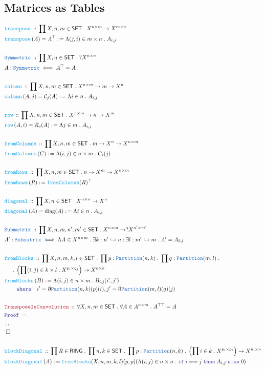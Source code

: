 \documentclass[12pt]{scrartcl}
\newcommand{\TYPE}[1]{\textcolor{NavyBlue}{\mathtt{#1}}}
\newcommand{\FUNC}[1]{\textcolor{Cerulean}{\mathtt{#1}}}
\newcommand{\LOGIC}[1]{\textcolor{Blue}{\mathtt{#1}}}
\newcommand{\THM}[1]{\textcolor{Maroon}{\mathtt{#1}}}
\renewcommand{\.}{\; . \;}
\newcommand{\de}{: \kern 0.1pc =}
\newcommand{\where}{\LOGIC{where}}
\newcommand{\If}{\LOGIC{if} \;}
\newcommand{\Then}{ \; \LOGIC{then} \;}
\newcommand{\Else}{\; \LOGIC{else} \;}
\newcommand{\Act}[1]{\left(#1\right)}
\newcommand{\Theorem}[2]{& \THM{#1} \, :: \, #2 \\ & \Proof = \\ }
\newcommand{\DeclareType}[2]{& \TYPE{#1} \, :: \, #2 \\}
\newcommand{\DefineType}[3]{& #1 : \TYPE{#2} \iff #3 \\}
\newcommand{\DeclareFunc}[2]{& \FUNC{#1} \, :: \, #2 \\}
\newcommand{\DefineFunc}[3]{&  \FUNC{#1}\Act{#2} \de #3 \\}
\newcommand{\DefineNamedFunc}[4]{&  \FUNC{#1}\Act{#2} = #3 \de #4 \\}
\newcommand{\NewLine}{\\ & \kern 1pc}
\newcommand{\Page}[1]{ \begin{align*} #1 \end{align*}   }
\newcommand{ \bd }{ \ByDef }
\newcommand{\NoProof}{ & \ldots \\ \EndProof}
\newcommand{\ToInj}{\hookrightarrow}
\newcommand{\QED}{\; \square}
\newcommand{\EndProof}{& \QED \\}
\newcommand{\ByDef}{\eth}
\newcommand{\Proof}{\LOGIC{Proof} \; }
\newcommand{\C}{\mathcal{C}}
\newcommand{\R}{\mathcal{R}}
\newcommand{\SET}{\mathsf{SET}}
\DeclareMathOperator{\diag}{diag}
\newcommand{\RING}{\mathsf{RING}}
\begin{document}
\subsection{Matrices as Tables}
\Page{
	\DeclareFunc{transpose}{\prod X,n,m \in \SET \. X^{n \times m} \to X^{m \times n} }
	\DefineNamedFunc{transpose}{A}{A^\top}{\Lambda (j,i) \in m \times n \. A_{i,j}}
	\\
	\DeclareType{Symmetric}{\prod X,n \in \SET \. ?X^{n \times n}}
	\DefineType{A}{Symmetric}{A^\top = A}
	\\
	\DeclareFunc{column}{\prod X,n,m \in \SET \. X^{n \times m} \to m \to X^n}
	\DefineNamedFunc{column}{A,j}{\C_j(A)}{\Lambda i \in n \. A_{i,j}}
	\\
	\DeclareFunc{row}{\prod X,n,m \in \SET \. X^{n \times m} \to n \to X^m}
	\DefineNamedFunc{row}{A,i}{\R_i(A)}{\Lambda j \in m \. A_{i,j}}
	\\
	\DeclareFunc{fromColumns}{\prod X,n,m \in \SET \. m \to X^n \to X^{n \times m}}
	\DefineFunc{fromColumns}{C}{\Lambda (i,j) \in n \times m \. C_i(j)}
	\\
	\DeclareFunc{fromRows}{\prod X,n,m \in \SET \. n \to X^m \to X^{n \times m}}
	\DefineFunc{fromRows}{R}{\FUNC{fromColumns}(R)^\top}
	\\
	\DeclareFunc{diagonal}{\prod X,n \in \SET \. X^{n \times n} \to X^n}
	\DefineNamedFunc{diagonal}{A}{\diag(A)}{\Lambda i \in n \. A_{i,i} }
	\\
	\DeclareType{Submatrix}{\prod X,n,m,n',m' \in \SET \. X^{n\times m} \to ?X^{n'\times m'}}
	\DefineType{A'}{Submatrix}{\Lambda A \in X^{n\times m} \. 
		\exists k : n' \ToInj n : \exists l : m' \ToInj m \. A' = A_{k,l} }
	\\
	\DeclareFunc{fromBlocks}{
		\prod X,n,m,k,l \in \SET \. 
		\prod p : \TYPE{Partition}(n,k) \.
		\prod q : \TYPE{Partition}(m,l) \.
		\NewLine \.
		\left(\prod (i,j) \in k \times l \. X^{p_i \times q_j}\right) \to X^{n \times k}
	}
	\DefineFunc{fromBlocks}{B}{
		\Lambda (i,j) \in n \times m \. 
		B_{i,j}(i',j') \NewLine
		\quad \where \quad
		i' = \bd \TYPE{Partition}(n,k)(p)(i),
		j' = \bd \TYPE{Partition}(m,l)(q)(j)
	}
	\\
	\Theorem{TransposeIsConvolution}{\forall X,n,m \in \SET \. \forall A \in A^{n\times m} \. A^{\top\top} = A}
	\NoProof
	\\
	\DeclareFunc{blockDiagonal}{
		\prod R \in \RING \. \prod n,k \in \SET \. \prod p : \TYPE{Partition}(n,k) \. 
		\left( \prod i \in k \. 
		X^{p_i \times p_i} \right) \to X^{n,\times n}
	}
	\DefineFunc{blockDiagonal}{A}{\FUNC{fromBlocks}(X,n,m,k,l)(p,p)(\Lambda (i,j) \in n \times n \. \If i == j \Then A_{i,j} \Else 0 )}
}
\end{document}
